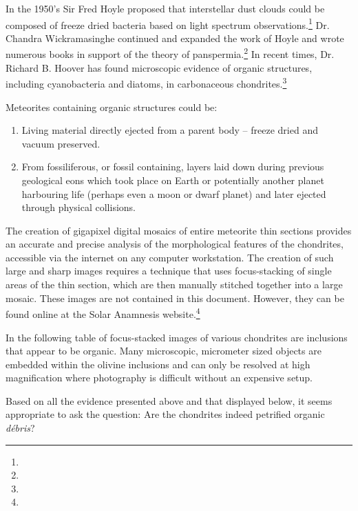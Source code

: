 \documentclass[a4paper, 12pt, oneside]{article}
\begin{document}
In the 1950's Sir Fred Hoyle proposed that interstellar dust clouds could be composed of freeze dried bacteria based on light spectrum observations.\footnote{} Dr. Chandra Wickramasinghe continued and expanded the work of Hoyle and wrote numerous books in support of the theory of panspermia.\footnote{} In recent times, Dr. Richard B. Hoover has found microscopic evidence of organic structures, including cyanobacteria and diatoms, in carbonaceous chondrites.\footnote{}

Meteorites containing organic structures could be:

\begin{enumerate}
   \item Living material directly ejected from a parent body -- freeze dried and vacuum preserved.
   \item From fossiliferous, or fossil containing, layers laid down during previous geological eons which took place on Earth or potentially another planet harbouring life (perhaps even a moon or dwarf planet) and later ejected through physical collisions.
\end{enumerate}

The creation of gigapixel digital mosaics of entire meteorite thin sections provides an accurate and precise analysis of the morphological features of the chondrites, accessible via the internet on any computer workstation. The creation of such large and sharp images requires a technique that uses focus-stacking of single areas of the thin section, which are then manually stitched together into a large mosaic. These images are not contained in this document. However, they can be found online at the Solar Anamnesis website.\footnote{}

In the following table of focus-stacked images of various chondrites are inclusions that appear to be organic. Many microscopic, micrometer sized objects are embedded within the olivine inclusions and can only be resolved at high magnification where photography is difficult without an expensive setup.

Based on all the evidence presented above and that displayed below, it seems appropriate to ask the question: Are the chondrites indeed petrified organic \emph{débris}?
\clearpage
\end{document}
